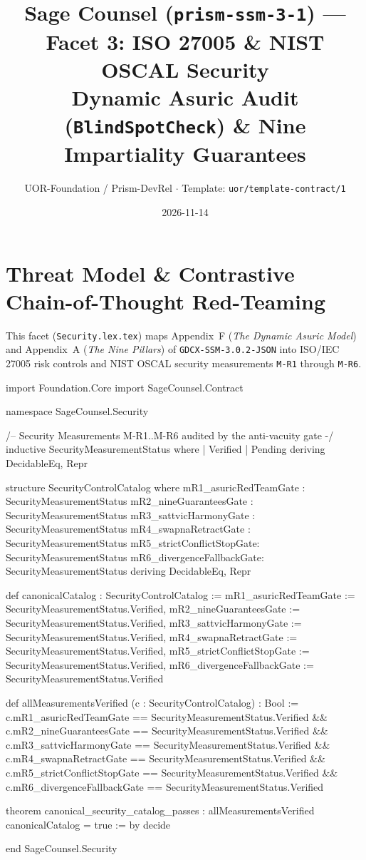 \documentclass[11pt,a4paper]{article}
\title{Sage Counsel (\texttt{prism-ssm-3-1}) --- Facet 3: ISO 27005 \& NIST OSCAL Security\\
\small Dynamic Asuric Audit (\texttt{BlindSpotCheck}) \& Nine Impartiality Guarantees}
\author{UOR-Foundation / Prism-DevRel $\cdot$ Template: \texttt{uor/template-contract/1}}
\date{2026-11-14}
\begin{document}
\maketitle

\section{Threat Model \& Contrastive Chain-of-Thought Red-Teaming}
This facet (\texttt{Security.lex.tex}) maps Appendix~F (\emph{The Dynamic Asuric Model}) and Appendix~A (\emph{The Nine Pillars}) of \texttt{GDCX-SSM-3.0.2-JSON} into ISO/IEC 27005 risk controls and NIST OSCAL security measurements \texttt{M-R1} through \texttt{M-R6}.

\begin{code}
import Foundation.Core
import SageCounsel.Contract

namespace SageCounsel.Security

/-- Security Measurements M-R1..M-R6 audited by the anti-vacuity gate -/
inductive SecurityMeasurementStatus where
  | Verified
  | Pending
  deriving DecidableEq, Repr

structure SecurityControlCatalog where
  mR1_asuricRedTeamGate     : SecurityMeasurementStatus
  mR2_nineGuaranteesGate    : SecurityMeasurementStatus
  mR3_sattvicHarmonyGate    : SecurityMeasurementStatus
  mR4_swapnaRetractGate     : SecurityMeasurementStatus
  mR5_strictConflictStopGate: SecurityMeasurementStatus
  mR6_divergenceFallbackGate: SecurityMeasurementStatus
  deriving DecidableEq, Repr

def canonicalCatalog : SecurityControlCatalog :=
  { mR1_asuricRedTeamGate      := SecurityMeasurementStatus.Verified,
    mR2_nineGuaranteesGate     := SecurityMeasurementStatus.Verified,
    mR3_sattvicHarmonyGate     := SecurityMeasurementStatus.Verified,
    mR4_swapnaRetractGate      := SecurityMeasurementStatus.Verified,
    mR5_strictConflictStopGate := SecurityMeasurementStatus.Verified,
    mR6_divergenceFallbackGate := SecurityMeasurementStatus.Verified }

def allMeasurementsVerified (c : SecurityControlCatalog) : Bool :=
  c.mR1_asuricRedTeamGate == SecurityMeasurementStatus.Verified &&
  c.mR2_nineGuaranteesGate == SecurityMeasurementStatus.Verified &&
  c.mR3_sattvicHarmonyGate == SecurityMeasurementStatus.Verified &&
  c.mR4_swapnaRetractGate == SecurityMeasurementStatus.Verified &&
  c.mR5_strictConflictStopGate == SecurityMeasurementStatus.Verified &&
  c.mR6_divergenceFallbackGate == SecurityMeasurementStatus.Verified

theorem canonical_security_catalog_passes :
    allMeasurementsVerified canonicalCatalog = true := by
  decide

end SageCounsel.Security
\end{code}
\end{document}
